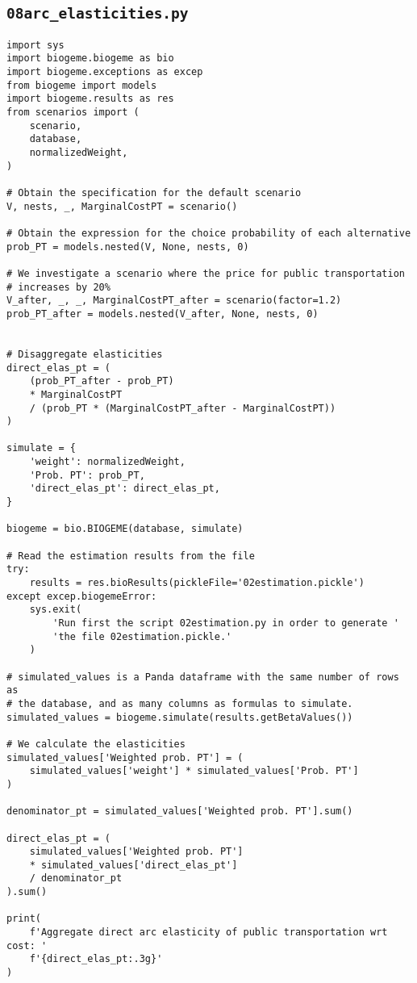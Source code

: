 \documentclass[12pt,a4paper]{article}
\begin{document}
\subsection{\lstinline$08arc_elasticities.py$}\label{sec:08arc_elasticities}
\begin{lstlisting}[style=numbers]
import sys
import biogeme.biogeme as bio
import biogeme.exceptions as excep
from biogeme import models
import biogeme.results as res
from scenarios import (
    scenario,
    database,
    normalizedWeight,
)

# Obtain the specification for the default scenario
V, nests, _, MarginalCostPT = scenario()

# Obtain the expression for the choice probability of each alternative
prob_PT = models.nested(V, None, nests, 0)

# We investigate a scenario where the price for public transportation
# increases by 20%
V_after, _, _, MarginalCostPT_after = scenario(factor=1.2)
prob_PT_after = models.nested(V_after, None, nests, 0)


# Disaggregate elasticities
direct_elas_pt = (
    (prob_PT_after - prob_PT)
    * MarginalCostPT
    / (prob_PT * (MarginalCostPT_after - MarginalCostPT))
)

simulate = {
    'weight': normalizedWeight,
    'Prob. PT': prob_PT,
    'direct_elas_pt': direct_elas_pt,
}

biogeme = bio.BIOGEME(database, simulate)

# Read the estimation results from the file
try:
    results = res.bioResults(pickleFile='02estimation.pickle')
except excep.biogemeError:
    sys.exit(
        'Run first the script 02estimation.py in order to generate '
        'the file 02estimation.pickle.'
    )

# simulated_values is a Panda dataframe with the same number of rows as
# the database, and as many columns as formulas to simulate.
simulated_values = biogeme.simulate(results.getBetaValues())

# We calculate the elasticities
simulated_values['Weighted prob. PT'] = (
    simulated_values['weight'] * simulated_values['Prob. PT']
)

denominator_pt = simulated_values['Weighted prob. PT'].sum()

direct_elas_pt = (
    simulated_values['Weighted prob. PT']
    * simulated_values['direct_elas_pt']
    / denominator_pt
).sum()

print(
    f'Aggregate direct arc elasticity of public transportation wrt cost: '
    f'{direct_elas_pt:.3g}'
)
\end{lstlisting}
\end{document}

